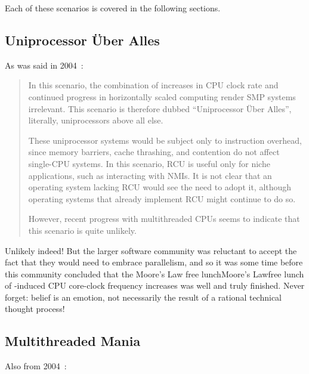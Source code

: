 Each of these scenarios is covered in the following sections.

\subsection{Uniprocessor \"Uber Alles}
\label{sec:future:Uniprocessor \"Uber Alles}

As was said in 2004~\cite{PaulEdwardMcKenneyPhD}:

\begin{quote}
	In this scenario, the combination of 
	increases in CPU
	clock rate and continued progress in horizontally scaled computing
	render SMP systems irrelevant.
	This scenario is therefore dubbed ``Uniprocessor \"Uber
	Alles'', literally, uniprocessors above all else.

	These uniprocessor systems would be subject only to instruction
	overhead, since memory barriers, cache thrashing, and contention
	do not affect single-CPU systems.
	In this scenario, RCU is useful only for niche applications, such
	as interacting with NMIs.
	It is not clear that an operating system lacking RCU would see
	the need to adopt it, although operating
	systems that already implement RCU might continue to do so.

	However, recent progress with multithreaded CPUs seems to indicate
	that this scenario is quite unlikely.
\end{quote}

Unlikely indeed!
But the larger software community was reluctant to accept the fact that
they would need to embrace parallelism, and so it was some time before
this community concluded that the 
{Moore's Law free lunch}{Moore's Law}{free lunch of}
-induced
CPU core-clock frequency increases was well and truly finished.
Never forget: belief is an emotion, not necessarily the result of a
rational technical thought process!

\subsection{Multithreaded Mania}
\label{sec:future:Multithreaded Mania}

Also from 2004~\cite{PaulEdwardMcKenneyPhD}:


